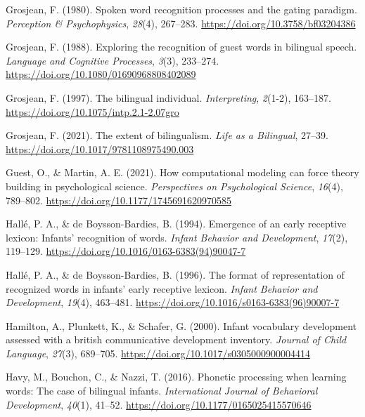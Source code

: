 \documentclass[
  12pt,
  b5paperpaper,
  twoside]{scrreprt}
\newlength{\cslhangindent}
\newlength{\cslentryspacingunit} %
\newenvironment{CSLReferences}[2] %
 {%
  \setlength{\parindent}{0pt}
  \ifodd #1
  \let\oldpar\par
  \def\par{\hangindent=\cslhangindent\oldpar}
  \fi
  \setlength{\parskip}{#2\cslentryspacingunit}
 }%
 {}
\begin{document}
\begin{CSLReferences}{1}{0}
\leavevmode{}%
Grosjean, F. (1980). Spoken word recognition processes and the gating
paradigm. \emph{Perception \& Psychophysics}, \emph{28}(4), 267--283.
\url{https://doi.org/10.3758/bf03204386}

\leavevmode{}%
Grosjean, F. (1988). Exploring the recognition of guest words in
bilingual speech. \emph{Language and Cognitive Processes}, \emph{3}(3),
233--274. \url{https://doi.org/10.1080/01690968808402089}

\leavevmode{}%
Grosjean, F. (1997). The bilingual individual. \emph{Interpreting},
\emph{2}(1-2), 163--187. \url{https://doi.org/10.1075/intp.2.1-2.07gro}

\leavevmode{}%
Grosjean, F. (2021). The extent of bilingualism. \emph{Life as a
Bilingual}, 27--39. \url{https://doi.org/10.1017/9781108975490.003}

\leavevmode{}%
Guest, O., \& Martin, A. E. (2021). How computational modeling can force
theory building in psychological science. \emph{Perspectives on
Psychological Science}, \emph{16}(4), 789--802.
\url{https://doi.org/10.1177/1745691620970585}

\leavevmode{}%
Hallé, P. A., \& de Boysson-Bardies, B. (1994). Emergence of an early
receptive lexicon: Infants' recognition of words. \emph{Infant Behavior
and Development}, \emph{17}(2), 119--129.
\url{https://doi.org/10.1016/0163-6383(94)90047-7}

\leavevmode{}%
Hallé, P. A., \& de Boysson-Bardies, B. (1996). The format of
representation of recognized words in infants' early receptive lexicon.
\emph{Infant Behavior and Development}, \emph{19}(4), 463--481.
\url{https://doi.org/10.1016/s0163-6383(96)90007-7}

\leavevmode{}%
Hamilton, A., Plunkett, K., \& Schafer, G. (2000). Infant vocabulary
development assessed with a british communicative development inventory.
\emph{Journal of Child Language}, \emph{27}(3), 689--705.
\url{https://doi.org/10.1017/s0305000900004414}

\leavevmode{}%
Havy, M., Bouchon, C., \& Nazzi, T. (2016). Phonetic processing when
learning words: The case of bilingual infants. \emph{International
Journal of Behavioral Development}, \emph{40}(1), 41--52.
\url{https://doi.org/10.1177/0165025415570646}


\end{CSLReferences}
\end{document}
